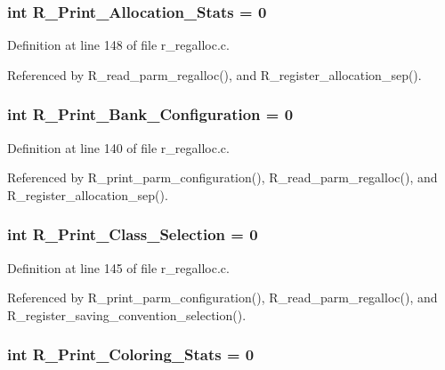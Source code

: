 \subsubsection{\setlength{\rightskip}{0pt plus 5cm}int \bf{R\_\-Print\_\-Allocation\_\-Stats} = 0}\label{r__regalloc_8c_f73157ef01eb0a33ef27781f0ac04eb2}




Definition at line 148 of file r\_\-regalloc.c.

Referenced by R\_\-read\_\-parm\_\-regalloc(), and R\_\-register\_\-allocation\_\-sep().
\subsubsection{\setlength{\rightskip}{0pt plus 5cm}int \bf{R\_\-Print\_\-Bank\_\-Configuration} = 0}\label{r__regalloc_8c_66608ad1425c79bfcda5672f8aee501f}




Definition at line 140 of file r\_\-regalloc.c.

Referenced by R\_\-print\_\-parm\_\-configuration(), R\_\-read\_\-parm\_\-regalloc(), and R\_\-register\_\-allocation\_\-sep().
\subsubsection{\setlength{\rightskip}{0pt plus 5cm}int \bf{R\_\-Print\_\-Class\_\-Selection} = 0}\label{r__regalloc_8c_e994b9ea68b7534a169ab7286c0ac2ae}




Definition at line 145 of file r\_\-regalloc.c.

Referenced by R\_\-print\_\-parm\_\-configuration(), R\_\-read\_\-parm\_\-regalloc(), and R\_\-register\_\-saving\_\-convention\_\-selection().
\subsubsection{\setlength{\rightskip}{0pt plus 5cm}int \bf{R\_\-Print\_\-Coloring\_\-Stats} = 0}\label{r__regalloc_8c_d0b75992fe4dd4f551a7a3d4045e63e4}




